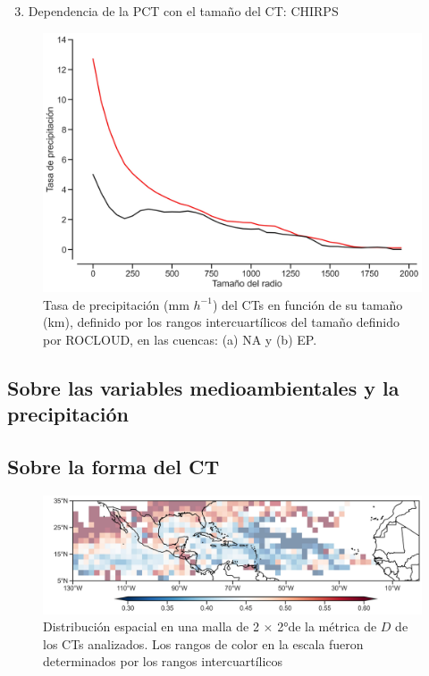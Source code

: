 \begin{frame}
\begin{enumerate}
\setcounter{enumi}{2}
    \item Dependencia de la PCT con el tamaño del CT: CHIRPS
\end{enumerate}
    \begin{figure}
        \centering
        \includegraphics[scale = 0.35]{Images/Figures/Fig_3_21.jpeg}
        \caption{Tasa de precipitación (mm $h^{-1}$) del CTs en función de su tamaño (km), definido por los rangos intercuartílicos del tamaño definido por ROCLOUD, en las cuencas: (a) {\red NA} y (b) {\gray EP}.}
        \label{fig:figchirps}
    \end{figure}
\end{frame}

\subsection{Sobre las variables medioambientales y la precipitación}
\begin{frame}

\end{frame}

\subsection{Sobre la forma del CT}
\begin{frame}
\begin{figure}
    \centering
    \includegraphics[scale = 0.3]{Images/Figures/Fig_3_26_1.jpeg}
    \caption{Distribución espacial en una malla de 2 $\times$ 2°de la métrica de $D$ de los CTs analizados. Los rangos de color en la escala fueron determinados por los rangos intercuartílicos}
    \label{fig:fig_10}
\end{figure}
\end{frame}

